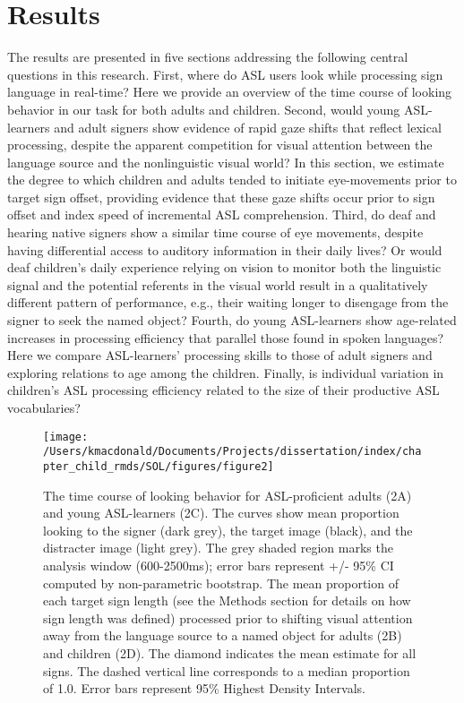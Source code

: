 \documentclass[oneside]{report}
\begin{document}
\hypertarget{results}{%
\section{Results}\label{results}}

The results are presented in five sections addressing the following
central questions in this research. First, where do ASL users look while
processing sign language in real-time? Here we provide an overview of
the time course of looking behavior in our task for both adults and
children. Second, would young ASL-learners and adult signers show
evidence of rapid gaze shifts that reflect lexical processing, despite
the apparent competition for visual attention between the language
source and the nonlinguistic visual world? In this section, we estimate
the degree to which children and adults tended to initiate eye-movements
prior to target sign offset, providing evidence that these gaze shifts
occur prior to sign offset and index speed of incremental ASL
comprehension. Third, do deaf and hearing native signers show a similar
time course of eye movements, despite having differential access to
auditory information in their daily lives? Or would deaf children's
daily experience relying on vision to monitor both the linguistic signal
and the potential referents in the visual world result in a
qualitatively different pattern of performance, e.g., their waiting
longer to disengage from the signer to seek the named object? Fourth, do
young ASL-learners show age-related increases in processing efficiency
that parallel those found in spoken languages? Here we compare
ASL-learners' processing skills to those of adult signers and exploring
relations to age among the children. Finally, is individual variation in
children's ASL processing efficiency related to the size of their
productive ASL vocabularies?
\begin{figure}[t]

{\centering \texttt{[image: /Users/kmacdonald/Documents/Projects/dissertation/index/chapter\_child\_rmds/SOL/figures/figure2]} 

}

\caption[Time course looking behavior for ASL-proficient adults and young ASL-learners]{The time course of looking behavior for ASL-proficient adults (2A) and young ASL-learners (2C). The curves show mean proportion looking to the signer (dark grey), the target image (black), and the distracter image (light grey). The grey shaded region marks the analysis window (600-2500ms); error bars represent +/- 95\% CI computed by non-parametric bootstrap. The mean proportion of each target sign length (see the Methods section for details on how sign length was defined) processed prior to shifting visual attention away from the language source to a named object for adults (2B) and children (2D). The diamond indicates the mean estimate for all signs. The dashed vertical line corresponds to a median proportion of 1.0. Error bars represent 95\% Highest Density Intervals.}\label{fig:sol-tc-figure}
\end{figure}
\end{document}
